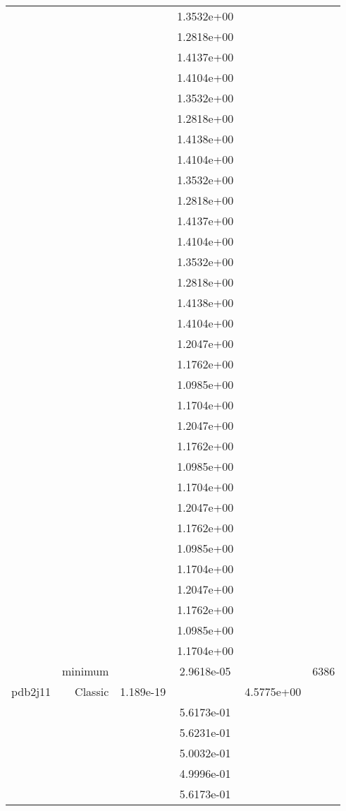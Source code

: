 \begin{xltabular}{\textwidth}{r|rS[table-format=1.3e+2]S[table-format=1.4e+2]S[table-format=1.4e+2]S[table-format=-1.5]}
&  &  & 1.3532e+00 & & \\
&  &  & 1.2818e+00 & & \\
&  &  & 1.4137e+00 & & \\
&  &  & 1.4104e+00 & & \\
&  &  & 1.3532e+00 & & \\
&  &  & 1.2818e+00 & & \\
&  &  & 1.4138e+00 & & \\
&  &  & 1.4104e+00 & & \\
&  &  & 1.3532e+00 & & \\
&  &  & 1.2818e+00 & & \\
&  &  & 1.4137e+00 & & \\
&  &  & 1.4104e+00 & & \\
&  &  & 1.3532e+00 & & \\
&  &  & 1.2818e+00 & & \\
&  &  & 1.4138e+00 & & \\
&  &  & 1.4104e+00 & & \\
&  &  & 1.2047e+00 & & \\
&  &  & 1.1762e+00 & & \\
&  &  & 1.0985e+00 & & \\
&  &  & 1.1704e+00 & & \\
&  &  & 1.2047e+00 & & \\
&  &  & 1.1762e+00 & & \\
&  &  & 1.0985e+00 & & \\
&  &  & 1.1704e+00 & & \\
&  &  & 1.2047e+00 & & \\
&  &  & 1.1762e+00 & & \\
&  &  & 1.0985e+00 & & \\
&  &  & 1.1704e+00 & & \\
&  &  & 1.2047e+00 & & \\
&  &  & 1.1762e+00 & & \\
&  &  & 1.0985e+00 & & \\
&  &  & 1.1704e+00 & & \\
& minimum &  & 2.9618e-05 & & 6386 \\  \addlinespace
pdb2j11 & Classic & 1.189e-19 &  & 4.5775e+00 & \\
&  &  & 5.6173e-01 & & \\
&  &  & 5.6231e-01 & & \\
&  &  & 5.0032e-01 & & \\
&  &  & 4.9996e-01 & & \\
&  &  & 5.6173e-01 & & \\

\end{xltabular}
